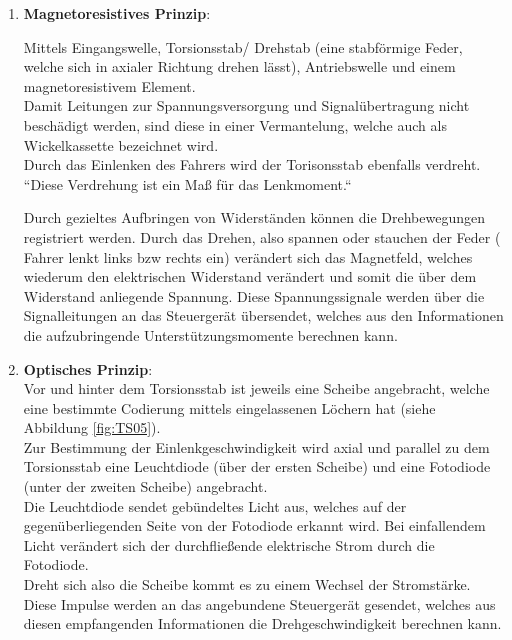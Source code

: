             \begin{enumerate}
                \item \textbf{Magnetoresistives Prinzip}:
                
                         Mittels Eingangswelle, Torsionsstab/ Drehstab (eine stabförmige Feder, welche sich in axialer Richtung drehen lässt), Antriebswelle und einem magnetoresistivem Element. \\
                         Damit Leitungen zur Spannungsversorgung und Signalübertragung nicht beschädigt werden, sind diese in einer Vermantelung, welche auch als Wickelkassette bezeichnet wird.\\
                         
                         Durch das Einlenken des Fahrers wird der Torisonsstab ebenfalls verdreht. ``Diese Verdrehung ist ein Maß für das Lenkmoment.`` \cite{TS_dreh}

                         Durch gezieltes Aufbringen von Widerständen können die Drehbewegungen registriert werden. Durch das Drehen, also spannen oder stauchen der Feder ( Fahrer lenkt links bzw rechts ein) verändert sich das Magnetfeld, welches wiederum den elektrischen Widerstand verändert und somit die über dem Widerstand anliegende Spannung. Diese Spannungssignale werden über die Signalleitungen an das Steuergerät übersendet, welches aus den Informationen die aufzubringende Unterstützungsmomente berechnen kann.				 

                \item \textbf{Optisches Prinzip}:\\

                        Vor und hinter dem Torsionsstab ist jeweils eine Scheibe angebracht, welche eine bestimmte Codierung mittels eingelassenen Löchern hat (siehe Abbildung \ref{fig:TS05}).\\
                        Zur Bestimmung der Einlenkgeschwindigkeit wird axial und parallel zu dem Torsionsstab eine Leuchtdiode (über der ersten Scheibe) und eine Fotodiode (unter der zweiten Scheibe) angebracht. \\
                        Die Leuchtdiode sendet gebündeltes Licht aus, welches auf der gegenüberliegenden Seite von der Fotodiode erkannt wird. Bei einfallendem Licht verändert sich der durchfließende elektrische Strom durch die Fotodiode.\\
                        Dreht sich also die Scheibe kommt es zu einem Wechsel der Stromstärke. Diese Impulse werden an das angebundene Steuergerät gesendet, welches aus diesen empfangenden Informationen die Drehgeschwindigkeit berechnen kann.\\
                        

\end{enumerate}
